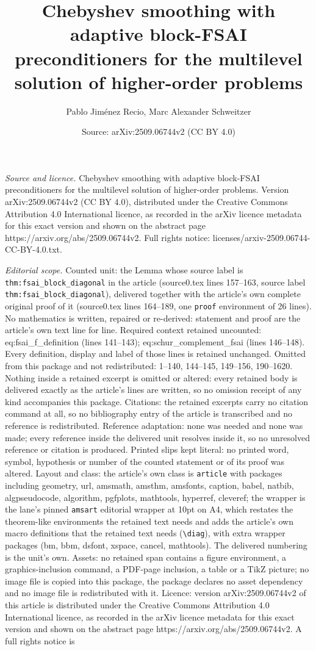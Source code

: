 \documentclass[10pt,a4paper]{amsart}
\title[Chebyshev smoothing with adaptive block-FSAI preconditioners]{Chebyshev smoothing with adaptive block-FSAI preconditioners for the multilevel solution of higher-order problems}
\author{Pablo Jim\'enez Recio, Marc Alexander Schweitzer}
\date{Source: arXiv:2509.06744v2 (CC BY 4.0)}
\begin{document}
\maketitle

\noindent\emph{Source and licence.} Chebyshev smoothing with adaptive block-FSAI preconditioners for the multilevel solution of higher-order problems. Version arXiv:2509.06744v2 (CC BY 4.0), distributed under the Creative Commons Attribution 4.0 International licence, as recorded in the arXiv licence metadata for this exact version and shown on the abstract page https://arxiv.org/abs/2509.06744v2. Full rights notice: licenses/arxiv-2509.06744-CC-BY-4.0.txt.\par\smallskip

\noindent\textit{Editorial scope.} Counted unit: the Lemma whose source label is \texttt{thm:fsai\_block\_diagonal} in the article (source0.tex lines 157--163, source label \texttt{thm:fsai\_block\_diagonal}), delivered together with the article's own complete original proof of it (source0.tex lines 164--189, one \texttt{proof} environment of 26 lines). No mathematics is written, repaired or re-derived: statement and proof are the article's own text line for line. Required context retained uncounted: eq:fsai\_f\_definition (lines 141--143); eq:schur\_complement\_fsai (lines 146--148). Every definition, display and label of those lines is retained unchanged. Omitted from this package and not redistributed: 1--140, 144--145, 149--156, 190--1620. Nothing inside a retained excerpt is omitted or altered: every retained body is delivered exactly as the article's lines are written, so no omission receipt of any kind accompanies this package. Citations: the retained excerpts carry no citation command at all, so no bibliography entry of the article is transcribed and no reference is redistributed. Reference adaptation: none was needed and none was made; every reference inside the delivered unit resolves inside it, so no unresolved reference or citation is produced. Printed slips kept literal: no printed word, symbol, hypothesis or number of the counted statement or of its proof was altered. Layout and class: the article's own class is \texttt{article} with packages including geometry, url, amsmath, amsthm, amsfonts, caption, babel, natbib, algpseudocode, algorithm, pgfplots, mathtools, hyperref, cleveref; the wrapper is the lane's pinned \texttt{amsart} editorial wrapper at 10pt on A4, which restates the theorem-like environments the retained text needs and adds the article's own macro definitions that the retained text needs (\texttt{\textbackslash diag}), with extra wrapper packages (bm, bbm, dsfont, xspace, cancel, mathtools). The delivered numbering is the unit's own. Assets: no retained span contains a figure environment, a graphics-inclusion command, a PDF-page inclusion, a table or a TikZ picture; no image file is copied into this package, the package declares no asset dependency and no image file is redistributed with it. Licence: version arXiv:2509.06744v2 of this article is distributed under the Creative Commons Attribution 4.0 International licence, as recorded in the arXiv licence metadata for this exact version and shown on the abstract page https://arxiv.org/abs/2509.06744v2. A full rights notice is 
\end{document}
